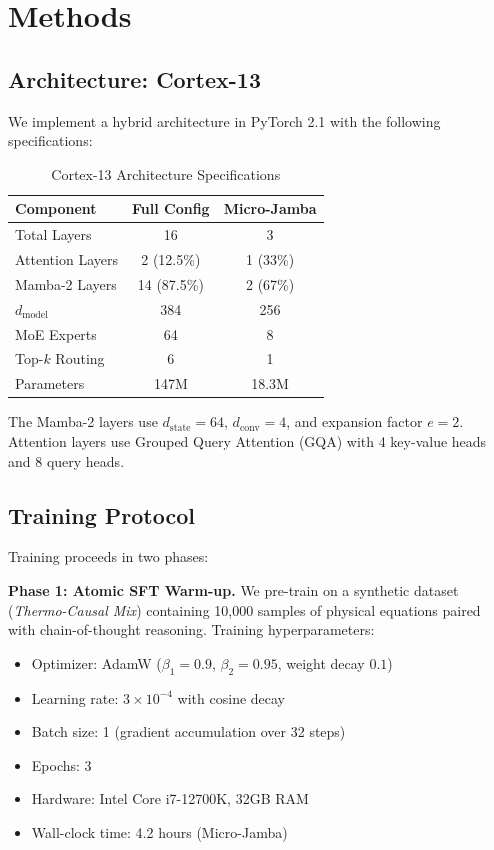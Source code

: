 \documentclass[12pt, a4paper]{article}
\begin{document}
\section{Methods}

\subsection{Architecture: Cortex-13}
We implement a hybrid architecture in PyTorch 2.1 with the following specifications:

\begin{table}[h]
\centering
\caption{Cortex-13 Architecture Specifications}
\label{tab:arch}
\begin{tabular}{@{}lcc@{}}
\toprule
\textbf{Component} & \textbf{Full Config} & \textbf{Micro-Jamba} \\
\midrule
Total Layers & 16 & 3 \\
Attention Layers & 2 (12.5\%) & 1 (33\%) \\
Mamba-2 Layers & 14 (87.5\%) & 2 (67\%) \\
$d_{\mathrm{model}}$ & 384 & 256 \\
MoE Experts & 64 & 8 \\
Top-$k$ Routing & 6 & 1 \\
Parameters & 147M & 18.3M \\
\bottomrule
\end{tabular}
\end{table}

The Mamba-2 layers use $d_{\mathrm{state}}=64$, $d_{\mathrm{conv}}=4$, and expansion factor $e=2$. Attention layers use Grouped Query Attention (GQA) with 4 key-value heads and 8 query heads.

\subsection{Training Protocol}
Training proceeds in two phases:

\textbf{Phase 1: Atomic SFT Warm-up.} We pre-train on a synthetic dataset (\textit{Thermo-Causal Mix}) containing 10,000 samples of physical equations paired with chain-of-thought reasoning. Training hyperparameters:
\begin{itemize}
    \item Optimizer: AdamW ($\beta_1=0.9$, $\beta_2=0.95$, weight decay $0.1$)
    \item Learning rate: $3 \times 10^{-4}$ with cosine decay
    \item Batch size: 1 (gradient accumulation over 32 steps)
    \item Epochs: 3
    \item Hardware: Intel Core i7-12700K, 32GB RAM
    \item Wall-clock time: 4.2 hours (Micro-Jamba)
\end{itemize}
\end{document}
